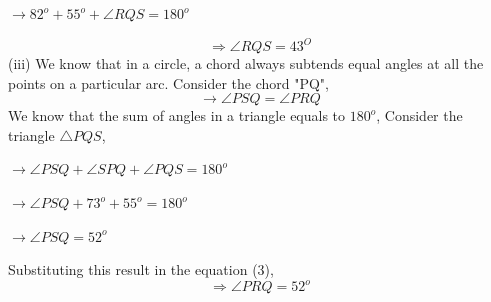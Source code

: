 \documentclass[8pt, twocolumn]{article}
\begin{document}
\begin{center}
    $\rightarrow 82^o + 55^o + \angle RQS = 180^o$
\end{center}
\begin{equation}
    \Rightarrow \angle RQS = 43^O
\end{equation}
(iii) We know that in a circle, a chord always subtends equal angles at all the points on a particular arc. Consider the chord "PQ",
\begin{equation}
    \rightarrow \angle PSQ = \angle PRQ
\end{equation}
We know that the sum of angles in a triangle equals to $180^o$, Consider the triangle $\triangle PQS$,
\begin{center}
    $\rightarrow \angle PSQ + \angle SPQ + \angle PQS = 180^o$ 
\end{center}
\begin{center}
    $\rightarrow \angle PSQ + 73^o + 55^o = 180^o $
\end{center}
\begin{center}
    $\rightarrow \angle PSQ = 52^o$
\end{center}
Substituting this result in the equation (3),
\begin{equation}
    \Rightarrow \angle PRQ = 52^o
\end{equation}
\end{document}
